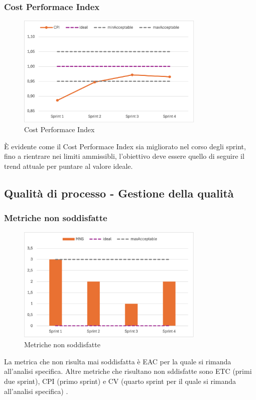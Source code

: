 \subsubsection{Cost Performace Index}
\begin{figure}[H]
    \centering
    \includegraphics[width=0.8\textwidth]{./images/CPI.png}
    \caption{Cost Performace Index}
\end{figure}
È evidente come il Cost Performace Index sia migliorato nel corso degli sprint, fino a rientrare nei limiti ammissibli, l'obiettivo deve essere quello di seguire il trend attuale per puntare al valore ideale.




\subsection{Qualità di processo - Gestione della qualità}
\subsubsection{Metriche non soddisfatte}
\begin{figure}[H]
    \centering
    \includegraphics[width=0.8\textwidth]{./images/MNS.png}
    \caption{Metriche non soddisfatte}
\end{figure}
La metrica che non risulta mai soddisfatta è EAC per la quale si rimanda all'analisi specifica. Altre metriche che risultano non sddisfatte sono ETC (primi due sprint), CPI (primo sprint) e CV (quarto sprint per il quale si rimanda all'analisi specifica)
.
